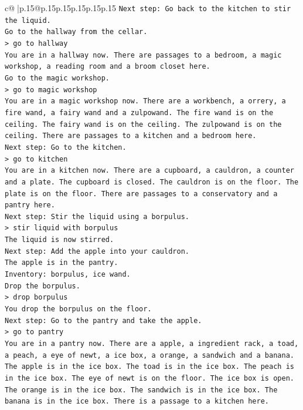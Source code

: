 \documentclass{article}
\begin{document}
{\begin{supertabular}{c@{$\;$}|p{.15\linewidth}@{}p{.15\linewidth}p{.15\linewidth}p{.15\linewidth}p{.15\linewidth}p{.15\linewidth}}
{{{\texttt{Next step: Go back to the kitchen to stir the liquid.} \\
\texttt{Go to the hallway from the cellar.} \\
\texttt{> go to hallway} \\
\texttt{You are in a hallway now. There are passages to a bedroom, a magic workshop, a reading room and a broom closet here.} \\
\texttt{Go to the magic workshop.} \\
\texttt{> go to magic workshop} \\
\texttt{You are in a magic workshop now. There are a workbench, a orrery, a fire wand, a fairy wand and a zulpowand. The fire wand is on the ceiling. The fairy wand is on the ceiling. The zulpowand is on the ceiling. There are passages to a kitchen and a bedroom here.} \\
\texttt{Next step: Go to the kitchen.} \\
\texttt{> go to kitchen} \\
\texttt{You are in a kitchen now. There are a cupboard, a cauldron, a counter and a plate. The cupboard is closed. The cauldron is on the floor. The plate is on the floor. There are passages to a conservatory and a pantry here.} \\
\texttt{Next step: Stir the liquid using a borpulus.} \\
\texttt{> stir liquid with borpulus} \\
\texttt{The liquid is now stirred.} \\
\texttt{Next step: Add the apple into your cauldron.} \\
\texttt{The apple is in the pantry.} \\
\texttt{Inventory: borpulus, ice wand.} \\
\texttt{Drop the borpulus.} \\
\texttt{> drop borpulus} \\
\texttt{You drop the borpulus on the floor.} \\
\texttt{Next step: Go to the pantry and take the apple.} \\
\texttt{> go to pantry} \\
\texttt{You are in a pantry now. There are a apple, a ingredient rack, a toad, a peach, a eye of newt, a ice box, a orange, a sandwich and a banana. The apple is in the ice box. The toad is in the ice box. The peach is in the ice box. The eye of newt is on the floor. The ice box is open. The orange is in the ice box. The sandwich is in the ice box. The banana is in the ice box. There is a passage to a kitchen here.} \\
}}}
\end{supertabular}}
\end{document}
